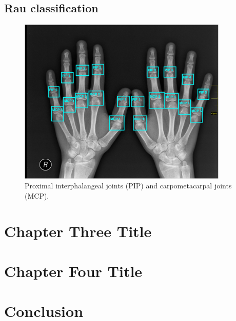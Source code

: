 \documentclass[12pt]{article}
\begin{document}
\subsection{Rau classification}
\label{subsec:rau}

\begin{figure}
\includegraphics[width=10cm]{labels}	
\caption{Proximal interphalangeal joints (PIP) and carpometacarpal joints (MCP).}
\label{fig:labels}
\end{figure}



\section{Chapter Three Title}


\section{Chapter Four Title}


\section{Conclusion}







\newpage
\printbibliography

\newpage
\listoffigures
\end{document}
